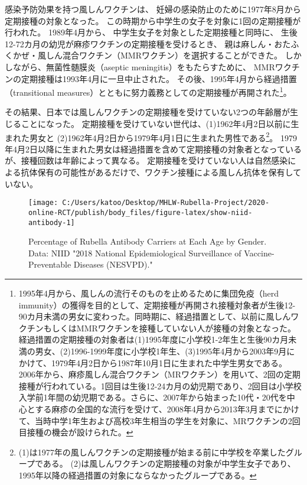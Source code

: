 \documentclass[
  11pt,
  a4paper,
]{article}
\begin{document}
感染予防効果を持つ風しんワクチンは、
妊婦の感染防止のために1977年8月から定期接種の対象となった。
この時期から中学生の女子を対象に1回の定期接種が行われた。
1989年4月から、
中学生女子を対象とした定期接種と同時に、
生後12-72カ月の幼児が麻疹ワクチンの定期接種を受けるとき、
親は麻しん・おたふくかぜ・風しん混合ワクチン（MMRワクチン）を選択することができた。
しかしながら、無菌性髄膜炎（aseptic meningitis）をもたらすために、
MMRワクチンの定期接種は1993年4月に一旦中止された。
その後、1995年4月から経過措置（transitional measures）とともに努力義務としての定期接種が再開された\footnote{1995年4月から、風しんの流行そのものを止めるために集団免疫（herd immunity）の獲得を目的として、定期接種が再開され接種対象者が生後12-90カ月未満の男女に変わった。同時期に、経過措置として、以前に風しんワクチンもしくはMMRワクチンを接種していない人が接種の対象となった。経過措置の定期接種の対象者は(1)1995年度に小学校1-2年生と生後90カ月未満の男女、(2)1996-1999年度に小学校1年生、(3)1995年4月から2003年9月にかけて、1979年4月2日から1987年10月1日に生まれた中学生男女である。2006年から、麻疹風しん混合ワクチン（MRワクチン）を用いて、2回の定期接種が行われている。1回目は生後12-24カ月の幼児期であり、2回目は小学校入学前1年間の幼児期である。さらに、2007年から始まった10代・20代を中心とする麻疹の全国的な流行を受けて、2008年4月から2013年3月までにかけて、当時中学1年生および高校3年生相当の学生を対象に、MRワクチンの2回目接種の機会が設けられた。}。

その結果、日本では風しんワクチンの定期接種を受けていない2つの年齢層が生じることになった。
定期接種を受けていない世代は、(1)1962年4月2日以前に生まれた男女と
(2)1962年4月2日から1979年4月1日に生まれた男性である\footnote{(1)は1977年の風しんワクチンの定期接種が始まる前に中学校を卒業したグループである。
  (2)は風しんワクチンの定期接種の対象が中学生女子であり、1995年以降の経過措置の対象にならなかったグループである。}。
1979年4月2日以降に生まれた男女は経過措置を含めて定期接種の対象者となっているが、接種回数は年齢によって異なる。
定期接種を受けていない人は自然感染による抗体保有の可能性があるだけで、ワクチン接種による風しん抗体を保有していない。

\begin{figure}[t]
\texttt{[image: C:/Users/katoo/Desktop/MHLW-Rubella-Project/2020-online-RCT/publish/body\_files/figure-latex/show-niid-antibody-1]} \caption{Percentage of Rubella Antibody Carriers at Each Age by Gender. Data: NIID "2018 National Epidemiological Surveillance of Vaccine-Preventable Diseases (NESVPD)."}\label{fig:show-niid-antibody}
\end{figure}
\end{document}
